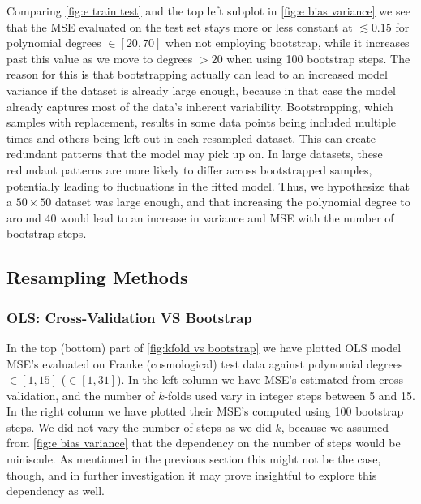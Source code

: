 \documentclass[aps,pra,english,notitlepage,reprint,nofootinbib]{revtex4-1}  %
\begin{document}
Comparing \cref{fig:e train test} and the top left subplot in \cref{fig:e bias variance} we see that the MSE evaluated on the test set stays more or less constant at $\lesssim0.15$ for polynomial degrees $\in[20,70]$ when not employing bootstrap, while it increases past this value as we move to degrees $>20$ when using 100 bootstrap steps. The reason for this is that bootstrapping actually can lead to an increased model variance if the dataset is already large enough, because in that case the model already captures most of the data's inherent variability. Bootstrapping, which samples with replacement, results in some data points being included multiple times and others being left out in each resampled dataset. This can create redundant patterns that the model may pick up on. In large datasets, these redundant patterns are more likely to differ across bootstrapped samples, potentially leading to fluctuations in the fitted model. Thus, we hypothesize that a $50\times50$ dataset was large enough, and that increasing the polynomial degree to around 40 would lead to an increase in variance and MSE with the number of bootstrap steps.


\subsection{Resampling Methods}
\subsubsection{OLS: Cross-Validation VS Bootstrap}
In the top (bottom) part of \cref{fig:kfold vs bootstrap} we have plotted OLS model MSE's evaluated on Franke (cosmological) test data against polynomial degrees $\in[1,15]$ ($\in[1,31]$). In the left column we have MSE's estimated from cross-validation, and the number of $k$-folds used vary in integer steps between 5 and 15. In the right column we have plotted their MSE's computed using 100 bootstrap steps. We did not vary the number of steps as we did $k$, because we assumed from \cref{fig:e bias variance} that the dependency on the number of steps would be miniscule. As mentioned in the previous section this might not be the case, though, and in further investigation it may prove insightful to explore this dependency as well.
\end{document}
